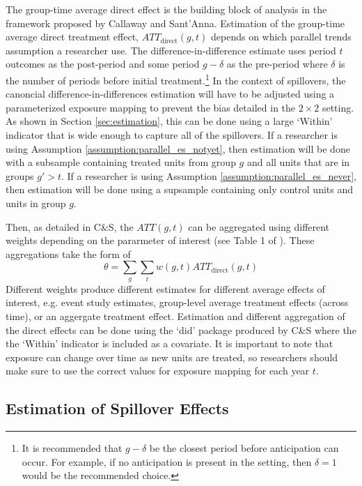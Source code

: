 \documentclass[11pt]{article}
\begin{document}
The group-time average direct effect is the building block of analysis in the framework proposed by Callaway and Sant'Anna. Estimation of the group-time average direct treatment effect, $ATT_{\text{direct}}(g,t)$ depends on which parallel trends assumption a researcher use. The difference-in-difference estimate uses period $t$ outcomes as the post-period and some period $g - \delta$ as the pre-period where $\delta$ is the number of periods before initial treatment.\footnote{It is recommended that $g - \delta$ be the closest period before anticipation can occur. For example, if no anticipation is present in the setting, then $\delta = 1$ would be the recommended choice.} In the context of spillovers, the canoncial difference-in-differences estimation will have to be adjusted using a parameterized exposure mapping to prevent the bias detailed in the $2 \times 2$ setting. As shown in Section \ref{sec:estimation}, this can be done using a large `Within' indicator that is wide enough to capture all of the spillovers. If a researcher is using Assumption \ref{assumption:parallel_es_notyet}, then estimation will be done with a subsample containing treated units from group $g$ and all units that are in groups $g' > t$. If a researcher is using Assumption \ref{assumption:parallel_es_never}, then estimation will be done using a supsample containing only control units and units in group $g$.

Then, as detailed in C\&S, the $ATT(g,t)$ can be aggregated using different weights depending on the pararmeter of interest (see Table 1 of \citet{Callaway_SantAnna_2020}). These aggregations take the form of
\begin{equation*}
    \theta = \sum_{g} \sum_{t} w(g,t) ATT_{\text{direct}}(g,t)    
\end{equation*} 
Different weights produce different estimates for different average effects of interest, e.g. event study estimates, group-level average treatment effects (across time), or an aggergate treatment effect. Estimation and different aggregation of the direct effects can be done using the `did' package produced by C\&S where the the `Within' indicator is included as a covariate. It is important to note that exposure can change over time as new units are treated, so researchers should make sure to use the correct values for exposure mapping for each year $t$.  


\subsection{Estimation of Spillover Effects}
\end{document}
